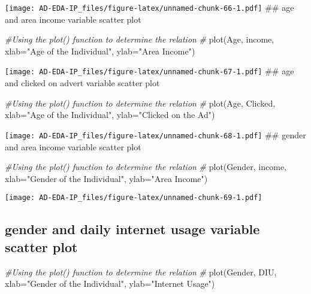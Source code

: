\documentclass[
]{article}
\newenvironment{Shaded}{\begin{snugshade}}{\end{snugshade}}
\newcommand{\AttributeTok}[1]{\textcolor[rgb]{0.77,0.63,0.00}{#1}}
\newcommand{\CommentTok}[1]{\textcolor[rgb]{0.56,0.35,0.01}{\textit{#1}}}
\newcommand{\FunctionTok}[1]{\textcolor[rgb]{0.00,0.00,0.00}{#1}}
\newcommand{\NormalTok}[1]{#1}
\newcommand{\StringTok}[1]{\textcolor[rgb]{0.31,0.60,0.02}{#1}}
\begin{document}
\texttt{[image: AD-EDA-IP\_files/figure-latex/unnamed-chunk-66-1.pdf]}
\#\# age and area income variable scatter plot

\begin{Shaded}
\begin{Highlighting}[]
\CommentTok{\#Using the plot() function to determine the relation }
\CommentTok{\#}
\FunctionTok{plot}\NormalTok{(Age, income, }\AttributeTok{xlab=}\StringTok{"Age of the Individual"}\NormalTok{, }\AttributeTok{ylab=}\StringTok{"Area Income"}\NormalTok{)}
\end{Highlighting}
\end{Shaded}

\texttt{[image: AD-EDA-IP\_files/figure-latex/unnamed-chunk-67-1.pdf]}
\#\# age and clicked on advert variable scatter plot

\begin{Shaded}
\begin{Highlighting}[]
\CommentTok{\#Using the plot() function to determine the relation }
\CommentTok{\#}
\FunctionTok{plot}\NormalTok{(Age, Clicked, }\AttributeTok{xlab=}\StringTok{"Age of the Individual"}\NormalTok{, }\AttributeTok{ylab=}\StringTok{"Clicked on the Ad"}\NormalTok{)}
\end{Highlighting}
\end{Shaded}

\texttt{[image: AD-EDA-IP\_files/figure-latex/unnamed-chunk-68-1.pdf]}
\#\# gender and area income variable scatter plot

\begin{Shaded}
\begin{Highlighting}[]
\CommentTok{\#Using the plot() function to determine the relation }
\CommentTok{\#}
\FunctionTok{plot}\NormalTok{(Gender, income, }\AttributeTok{xlab=}\StringTok{"Gender of the Individual"}\NormalTok{, }\AttributeTok{ylab=}\StringTok{"Area Income"}\NormalTok{)}
\end{Highlighting}
\end{Shaded}

\texttt{[image: AD-EDA-IP\_files/figure-latex/unnamed-chunk-69-1.pdf]}

\hypertarget{gender-and-daily-internet-usage-variable-scatter-plot}{%
\subsection{gender and daily internet usage variable scatter
plot}\label{gender-and-daily-internet-usage-variable-scatter-plot}}

\begin{Shaded}
\begin{Highlighting}[]
\CommentTok{\#Using the plot() function to determine the relation }
\CommentTok{\#}
\FunctionTok{plot}\NormalTok{(Gender, DIU, }\AttributeTok{xlab=}\StringTok{"Gender of the Individual"}\NormalTok{, }\AttributeTok{ylab=}\StringTok{"Internet Usage"}\NormalTok{)}
\end{Highlighting}
\end{Shaded}
\end{document}
